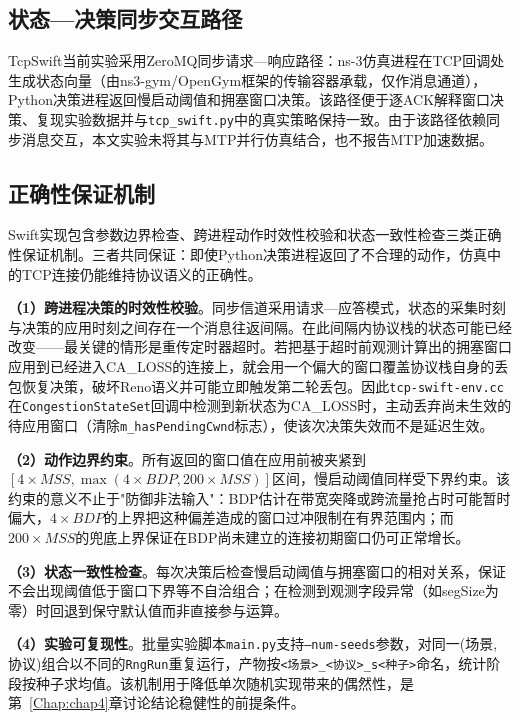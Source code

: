 \subsection{状态—决策同步交互路径}
\label{sec:sync-path}

TcpSwift当前实验采用ZeroMQ同步请求—响应路径：ns-3仿真进程在TCP回调处生成状态向量（由ns3-gym/OpenGym框架的传输容器承载，仅作消息通道），Python决策进程返回慢启动阈值和拥塞窗口决策。该路径便于逐ACK解释窗口决策、复现实验数据并与\texttt{tcp\_swift.py}中的真实策略保持一致。由于该路径依赖同步消息交互，本文实验未将其与MTP并行仿真结合，也不报告MTP加速数据。

\subsection{正确性保证机制}
\label{sec:correctness}

Swift实现包含参数边界检查、跨进程动作时效性校验和状态一致性检查三类正确性保证机制。三者共同保证：即使Python决策进程返回了不合理的动作，仿真中的TCP连接仍能维持协议语义的正确性。

\textbf{（1）跨进程决策的时效性校验}。同步信道采用请求—应答模式，状态的采集时刻与决策的应用时刻之间存在一个消息往返间隔。在此间隔内协议栈的状态可能已经改变——最关键的情形是重传定时器超时。若把基于超时前观测计算出的拥塞窗口应用到已经进入CA\_LOSS的连接上，就会用一个偏大的窗口覆盖协议栈自身的丢包恢复决策，破坏Reno语义并可能立即触发第二轮丢包。因此\texttt{tcp-swift-env.cc}在\texttt{CongestionStateSet}回调中检测到新状态为CA\_LOSS时，主动丢弃尚未生效的待应用窗口（清除\texttt{m\_hasPendingCwnd}标志），使该次决策失效而不是延迟生效。

\textbf{（2）动作边界约束}。所有返回的窗口值在应用前被夹紧到$[4 \times MSS, \max(4 \times BDP, 200 \times MSS)]$区间，慢启动阈值同样受下界约束。该约束的意义不止于"防御非法输入"：BDP估计在带宽突降或跨流量抢占时可能暂时偏大，$4 \times BDP$的上界把这种偏差造成的窗口过冲限制在有界范围内；而$200 \times MSS$的兜底上界保证在BDP尚未建立的连接初期窗口仍可正常增长。

\textbf{（3）状态一致性检查}。每次决策后检查慢启动阈值与拥塞窗口的相对关系，保证不会出现阈值低于窗口下界等不自洽组合；在检测到观测字段异常（如segSize为零）时回退到保守默认值而非直接参与运算。

\textbf{（4）实验可复现性}。批量实验脚本\texttt{main.py}支持\texttt{--num-seeds}参数，对同一(场景, 协议)组合以不同的\texttt{RngRun}重复运行，产物按\texttt{<场景>\_<协议>\_s<种子>}命名，统计阶段按种子求均值。该机制用于降低单次随机实现带来的偶然性，是第~\ref{Chap:chap4}章讨论结论稳健性的前提条件。

